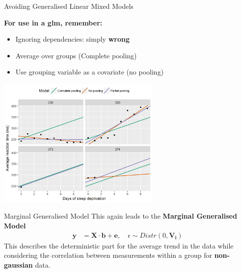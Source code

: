 \documentclass{beamer}
\newenvironment{VerbatimIN}
 {\VerbatimEnvironment
  \begin{tcolorbox}[
    breakable,
    colback=lightgray,
    spartan
  ]%
  \begin{Verbatim}}
 {\end{Verbatim}\end{tcolorbox}}
\begin{document}
\begin{frame}{Avoiding Generalised Linear Mixed Models}

\large
\textbf{For use in a glm, remember:}
\begin{itemize}
    \item Ignoring dependencies: simply \textbf{wrong}
    \item Average over groups (Complete pooling)
    \item Use grouping variable as a covariate (no pooling)
\end{itemize}

\includegraphics[width=0.6\textwidth]{lectures/day_5_theory_of_mems/figures/zoomed-in-partial-pooling-1.png}
\end{frame}


\begin{frame}{Marginal Generalised Model}
This again leads to the \textbf{Marginal Generalised Model}
\begin{align*}
    \mathbf{y} &= \mathbf{X} \cdot \mathbf{b} + \mathbf{e}, \quad \epsilon \sim Distr(0, \mathbf{V_i})
\end{align*}
This describes the deterministic part for the average trend in the data while considering the correlation between measurements within a group for \textbf{non-gaussian} data.
\end{frame}
\end{document}
